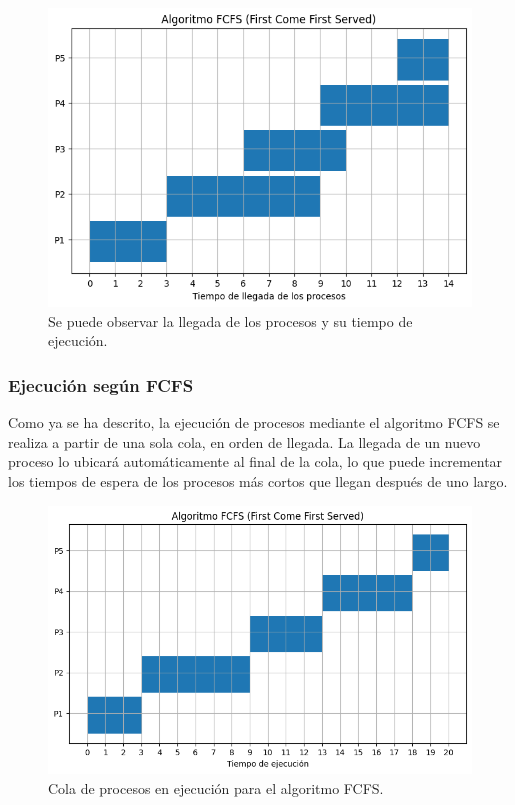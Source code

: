 \begin{figure}[H] \centering \includegraphics[width=0.8\linewidth]{Imagenes/Fcfs_tiempo.png} \caption{Se puede observar la llegada de los procesos y su tiempo de ejecución.} \end{figure}

\subsubsection{Ejecución según FCFS} Como ya se ha descrito, la ejecución de procesos mediante el algoritmo FCFS se realiza a partir de una sola cola, en orden de llegada. La llegada de un nuevo proceso lo ubicará automáticamente al final de la cola, lo que puede incrementar los tiempos de espera de los procesos más cortos que llegan después de uno largo.

\begin{figure}[H] \centering \includegraphics[width=0.8\linewidth]{Imagenes/fcfs_ejecucion.png} 
	\caption{Cola de procesos en ejecución para el algoritmo FCFS.} 
\end{figure}


